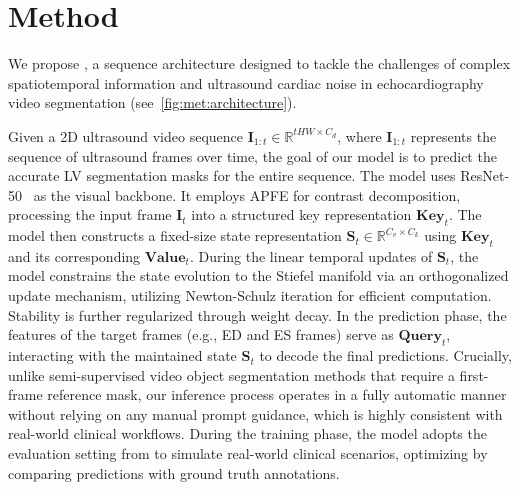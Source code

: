 \section{Method}
    \label{sec:method}

\noindent
We propose \mymodel, a sequence architecture designed to tackle the challenges of complex spatiotemporal information and ultrasound cardiac noise in echocardiography video segmentation (see~\cref{fig:met:architecture}).

Given a 2D ultrasound video sequence $\boldsymbol{I}_{1:t} \in \mathbb{R}^{tHW \times C_d}$, where $\boldsymbol{I}_{1:t}$ represents the sequence of ultrasound frames over time, the goal of our model is to predict the accurate LV segmentation masks for the entire sequence.
The model uses ResNet-50~\cite{He_CVPR16_resnet} as the visual backbone.
It employs APFE for contrast decomposition, processing the input frame $\mathbf{I}_t$ into a structured key representation $\mathbf{Key}_t$.
The model then constructs a fixed-size state representation $\mathbf{S}_t \in \mathbb{R}^{C_v \times C_k}$ using $\mathbf{Key}_t$ and its corresponding $\mathbf{Value}_t$.
During the linear temporal updates of $\mathbf{S}_t$, the model constrains the state evolution to the Stiefel manifold via an orthogonalized update mechanism, utilizing Newton-Schulz iteration for efficient computation.
Stability is further regularized through weight decay.
In the prediction phase, the features of the target frames (e.g., ED and ES frames) serve as $\mathbf{Query}_t$, interacting with the maintained state $\mathbf{S}_t$ to decode the final predictions.
Crucially, unlike semi-supervised video object segmentation methods that require a first-frame reference mask, our inference process operates in a fully automatic manner without relying on any manual prompt guidance, which is highly consistent with real-world clinical workflows.
During the training phase, the model adopts the evaluation setting from \cite{deng2024memsam,ICCV25_gdkvm} to simulate real-world clinical scenarios, optimizing by comparing predictions with ground truth annotations.